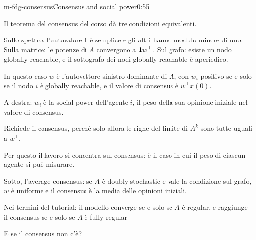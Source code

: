 \begin{slide}{m-fdg-consensus}{Consensus and social power}{0:55 {\color{red}}}
  \begin{discorso}
    \item Il teorema del consensus del corso dà tre condizioni equivalenti.
    \item Sullo spettro: l'autovalore 1 è semplice e gli altri hanno modulo minore di uno. Sulla matrice: le potenze di $A$ convergono a $\mathbf{1} w^\top$. Sul grafo: esiste un nodo globally reachable, e il sottografo dei nodi globally reachable è aperiodico.
    \item In questo caso $w$ è l'autovettore sinistro dominante di $A$, con $w_i$ positivo se e solo se il nodo $i$ è globally reachable, e il valore di consensus è $w^\top x(0)$.
    \item A destra: $w_i$ è la social power dell'agente $i$, il peso della sua opinione iniziale nel valore di consensus.
    \item Richiede il consensus, perché solo allora le righe del limite di $A^k$ sono tutte uguali a $w^\top$.
    \item {\color{blue}Per questo il lavoro si concentra sul consensus: è il caso in cui il peso di ciascun agente si può misurare.}
    \item Sotto, l'average consensus: se $A$ è doubly-stochastic e vale la condizione sul grafo, $w$ è uniforme e il consensus è la media delle opinioni iniziali.
    \item Nei termini del tutorial: il modello converge se e solo se $A$ è regular, e raggiunge il consensus se e solo se $A$ è fully regular.
    \item E se il consensus non c'è?
  \end{discorso}
\end{slide}

